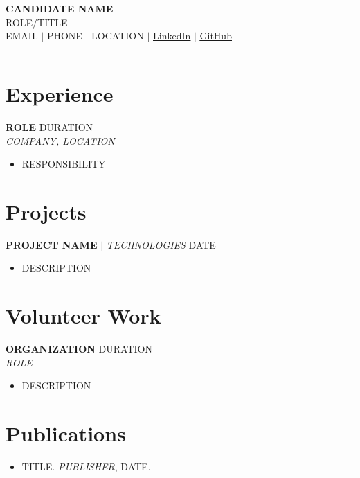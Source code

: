 \documentclass[letterpaper,10pt]{article}
\newcommand{\resumeItem}[1]{\item\small{#1\vspace{-2pt}}}
\newcommand{\resumeItemListStart}{\begin{itemize}[leftmargin=*,topsep=0pt]}
\newcommand{\resumeItemListEnd}{\end{itemize}\vspace{-4pt}}
\begin{document}
\begin{center}
  {\Huge\bfseries CANDIDATE NAME} \\ \vspace{4pt}
  {\color{accentblue} ROLE/TITLE} \\ \vspace{4pt}
  \small EMAIL $|$ PHONE $|$ LOCATION $|$
  \href{LINKEDIN}{\underline{LinkedIn}} $|$
  \href{GITHUB}{\underline{GitHub}}
\end{center}

\vspace{4pt}
\noindent\color{accentblue}\rule{\linewidth}{1.5pt}
\vspace{4pt}

\begin{minipage}[t]{0.63\textwidth}

\section{Experience}
\textbf{ROLE} \hfill DURATION \\
\textit{COMPANY, LOCATION}
\resumeItemListStart
  \resumeItem{RESPONSIBILITY}
\resumeItemListEnd

\section{Projects}
\textbf{PROJECT NAME} $|$ \textit{TECHNOLOGIES} \hfill DATE
\resumeItemListStart
  \resumeItem{DESCRIPTION}
\resumeItemListEnd

\section{Volunteer Work}
\textbf{ORGANIZATION} \hfill DURATION \\
\textit{ROLE}
\resumeItemListStart
  \resumeItem{DESCRIPTION}
\resumeItemListEnd

\section{Publications}
\resumeItemListStart
  \resumeItem{TITLE. \textit{PUBLISHER}, DATE.}
\resumeItemListEnd

\end{minipage}
\hfill
\end{document}
